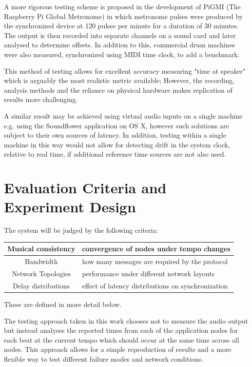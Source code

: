 \documentclass[11pt]{article} %
\theoremstyle{plain}
\theoremstyle{definition}
\begin{document}
A more rigorous testing scheme is proposed in the development of
PiGMI\cite{Oda2016} (The Raspberry Pi Global Metronome) in which metronome
pulses were produced by the synchronized device at 120 pulses per minute for a
duration of 30 minutes. The output is then recorded into separate channels on a
sound card and later analysed to determine offsets. In addition to this,
commercial drum machines were also measured, synchronized using MIDI time
clock, to add a benchmark.

This method of testing allows for excellent accuracy measuring "time at
speaker" which is arguably the most realistic metric available; However, the
recording, analysis methods and the reliance on physical hardware makes
replication of results more challenging.

A similar result may be achieved using virtual audio inputs on a single machine
e.g. using the Soundflower application on OS X, however such solutions are
subject to their own sources of latency. In addition, testing within a single
machine in this way would not allow for detecting drift in the system clock,
relative to real time, if additional reference time sources are not also used.

\section{Evaluation Criteria and Experiment Design}

The system will be judged by the following criteria:

\begin{center}
\begin{tabular}{|c|l|}
 \hline
  Musical consistency & convergence of nodes under tempo changes \\
  \hline
  Bandwidth & how many messages are required by the protocol \\
  \hline
  Network Topologies & performance under different network layouts \\
  \hline
  Delay distributions & effect of latency distributions on synchronization\\
 \hline
\end{tabular}
\end{center}

These are defined in more detail below.

The testing approach taken in this work chooses not to measure the audio output
but instead analyses the reported times from each of the application nodes for
each beat at the current tempo which should occur at the same time across all
nodes. This approach allows for a simple reproduction of results and a more
flexible way to test different failure modes and network conditions.
\end{document}

